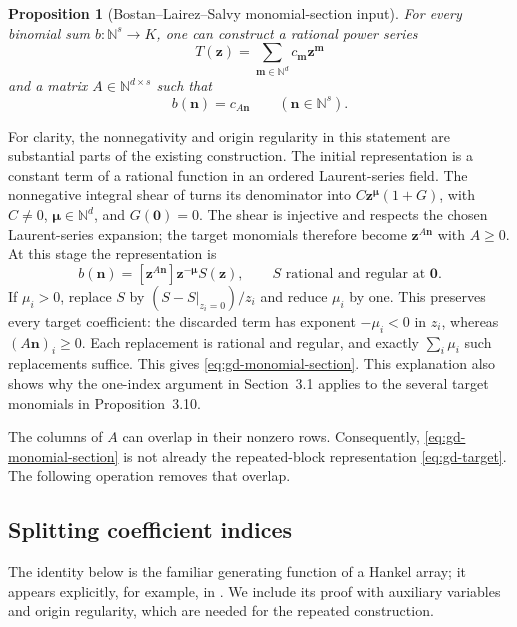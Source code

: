 \documentclass[11pt,a4paper]{article}
\newtheorem{proposition}[theorem]{Proposition}
\theoremstyle{remark}\newtheorem{remark}[theorem]{Remark}
\begin{document}
\begin{proposition}[Bostan--Lairez--Salvy monomial-section input]
\label{prop:gd-bls}
For every binomial sum $b\colon\mathbb N^s\to K$, one can construct a
rational power series
\[
 T(\boldsymbol z)=\sum_{\boldsymbol m\in\mathbb N^d}
 c_{\boldsymbol m}\boldsymbol z^{\boldsymbol m}
\]
and a matrix $A\in\mathbb N^{d\times s}$ such that
\begin{equation}
 b(\boldsymbol n)=c_{A\boldsymbol n}
 \qquad(\boldsymbol n\in\mathbb N^s).
 \label{eq:gd-monomial-section}
\end{equation}
\end{proposition}

For clarity, the nonnegativity and origin regularity in this statement
are substantial parts of the existing construction.  The initial
representation is a constant term of a rational function in an ordered
Laurent-series field.  The nonnegative integral shear of
\cite[Lemma~3.11]{BLS2017} turns its denominator into
$C\boldsymbol z^{\boldsymbol\mu}(1+G)$, with
$C\ne0$, $\boldsymbol\mu\in\mathbb N^d$, and $G(\boldsymbol0)=0$.
The shear is injective and respects the chosen Laurent-series expansion;
the target monomials therefore become $\boldsymbol z^{A\boldsymbol n}$
with $A\ge0$.  At this stage the representation is
\[
 b(\boldsymbol n)=
 [\boldsymbol z^{A\boldsymbol n}]
 \boldsymbol z^{-\boldsymbol\mu}S(\boldsymbol z),
 \qquad S\text{ rational and regular at }\boldsymbol0.
\]
If $\mu_i>0$, replace $S$ by
$(S-S|_{z_i=0})/z_i$ and reduce $\mu_i$ by one.  This preserves every
target coefficient: the discarded term has exponent $-\mu_i<0$ in
$z_i$, whereas $(A\boldsymbol n)_i\ge0$.
Each replacement is rational and regular, and exactly
$\sum_i\mu_i$ such replacements suffice.  This gives
\eqref{eq:gd-monomial-section}.  This explanation also shows why the
one-index argument in Section~3.1 applies to the several target
monomials in Proposition~3.10.

The columns of $A$ can overlap in their nonzero rows.  Consequently,
\eqref{eq:gd-monomial-section} is not already the repeated-block
representation \eqref{eq:gd-target}.  The following operation removes
that overlap.

\subsection{Splitting coefficient indices}

The identity below is the familiar generating function of a Hankel
array; it appears explicitly, for example, in \cite[p.~5]{Barry2016}.
We include its proof with auxiliary variables and origin regularity,
which are needed for the repeated construction.
\end{document}
